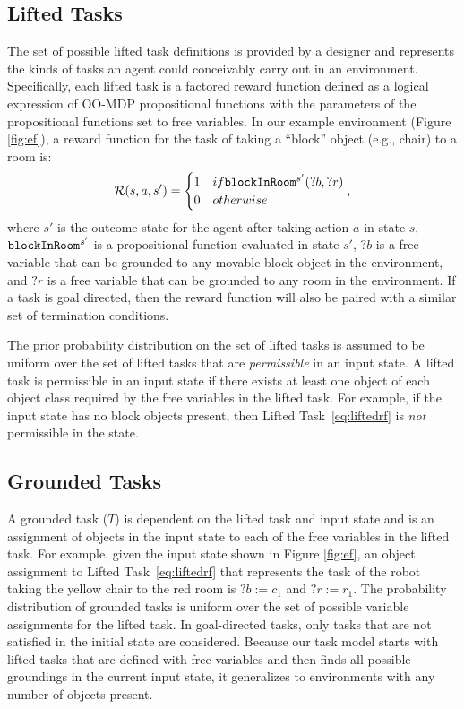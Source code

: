 \documentclass[conference]{IEEEtran}
\begin{document}
\subsection{Lifted Tasks}
The set of possible lifted task definitions is provided by a designer and represents the kinds of tasks an agent could conceivably carry out in an environment. Specifically, each lifted task is a factored reward function defined as a logical expression of OO-MDP propositional functions with the parameters of the propositional functions set to free variables. In our example environment (Figure \ref{fig:ef}), a reward function for the task of taking a ``block'' object (e.g., chair) to a room is:
\begin{equation}
\label{eq:liftedrf}
{\cal R}(s, a, s') = \begin{cases}
1 & \mbox{if } {\tt blockInRoom}^{s'}(?b, ?r) \\
0 & \mbox{otherwise}
\end{cases},
\end{equation}
where $s'$ is the outcome state for the agent after taking action $a$ in state $s$, ${\tt blockInRoom}^{s'}$ is a propositional function evaluated in state $s'$, $?b$ is a free variable that can be grounded to any movable block object in the environment, and $?r$ is a free variable that can be grounded to any room in the environment. 
If a task is goal directed, then the reward function will also be paired with a similar set of termination conditions.

The prior probability distribution on the set of lifted tasks is assumed to be uniform over the set of lifted tasks that are {\em permissible} in an input state. A lifted task is permissible in an input state if there exists at least one object of each object class required by the free variables in the lifted task. For example, if the input state has no block objects present, then Lifted Task~\ref{eq:liftedrf} is {\em not} permissible in the state. 

\subsection{Grounded Tasks}
A grounded task ($T$) is dependent on the lifted task and input state and is an assignment of objects in the input state to each of the free variables in the lifted task. For example, given the input state shown in Figure \ref{fig:ef}, an object assignment to Lifted Task~\ref{eq:liftedrf} that represents the task of the robot taking the yellow chair to the red room is $?b:=c_1$ and $?r:=r_1$. The probability distribution of grounded tasks is uniform over the set of possible variable assignments for the lifted task. In goal-directed tasks, only tasks that are not satisfied in the initial state are considered.
Because our task model starts with lifted tasks that are defined with free variables and then finds all possible groundings in the current input state, it generalizes to environments with any number of objects present.
\end{document}
